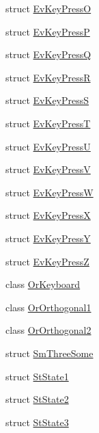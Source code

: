 \begin{DoxyCompactItemize}
\item 
struct \hyperlink{structsm__three__some_1_1EvKeyPressO}{Ev\+Key\+PressO}
\item 
struct \hyperlink{structsm__three__some_1_1EvKeyPressP}{Ev\+Key\+PressP}
\item 
struct \hyperlink{structsm__three__some_1_1EvKeyPressQ}{Ev\+Key\+PressQ}
\item 
struct \hyperlink{structsm__three__some_1_1EvKeyPressR}{Ev\+Key\+PressR}
\item 
struct \hyperlink{structsm__three__some_1_1EvKeyPressS}{Ev\+Key\+PressS}
\item 
struct \hyperlink{structsm__three__some_1_1EvKeyPressT}{Ev\+Key\+PressT}
\item 
struct \hyperlink{structsm__three__some_1_1EvKeyPressU}{Ev\+Key\+PressU}
\item 
struct \hyperlink{structsm__three__some_1_1EvKeyPressV}{Ev\+Key\+PressV}
\item 
struct \hyperlink{structsm__three__some_1_1EvKeyPressW}{Ev\+Key\+PressW}
\item 
struct \hyperlink{structsm__three__some_1_1EvKeyPressX}{Ev\+Key\+PressX}
\item 
struct \hyperlink{structsm__three__some_1_1EvKeyPressY}{Ev\+Key\+PressY}
\item 
struct \hyperlink{structsm__three__some_1_1EvKeyPressZ}{Ev\+Key\+PressZ}
\item 
class \hyperlink{classsm__three__some_1_1OrKeyboard}{Or\+Keyboard}
\item 
class \hyperlink{classsm__three__some_1_1OrOrthogonal1}{Or\+Orthogonal1}
\item 
class \hyperlink{classsm__three__some_1_1OrOrthogonal2}{Or\+Orthogonal2}
\item 
struct \hyperlink{structsm__three__some_1_1SmThreeSome}{Sm\+Three\+Some}
\item 
struct \hyperlink{structsm__three__some_1_1StState1}{St\+State1}
\item 
struct \hyperlink{structsm__three__some_1_1StState2}{St\+State2}
\item 
struct \hyperlink{structsm__three__some_1_1StState3}{St\+State3}
\end{DoxyCompactItemize}
